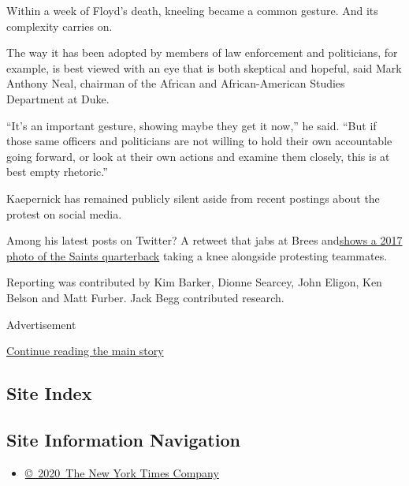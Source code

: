 Within a week of Floyd's death, kneeling became a common gesture. And
its complexity carries on.

The way it has been adopted by members of law enforcement and
politicians, for example, is best viewed with an eye that is both
skeptical and hopeful, said Mark Anthony Neal, chairman of the African
and African-American Studies Department at Duke.

``It's an important gesture, showing maybe they get it now,'' he said.
``But if those same officers and politicians are not willing to hold
their own accountable going forward, or look at their own actions and
examine them closely, this is at best empty rhetoric.''

Kaepernick has remained publicly silent aside from recent postings about
the protest on social media.

Among his latest posts on Twitter? A retweet that jabs at Brees
and\href{https://twitter.com/kylekuzma/status/1268366393457602561?s=20}{shows
a 2017 photo of the Saints quarterback} taking a knee alongside
protesting teammates.

Reporting was contributed by Kim Barker, Dionne Searcey, John Eligon,
Ken Belson and Matt Furber. Jack Begg contributed research.

Advertisement

\protect\hyperlink{after-bottom}{Continue reading the main story}

\hypertarget{site-index}{%
\subsection{Site Index}\label{site-index}}

\hypertarget{site-information-navigation}{%
\subsection{Site Information
Navigation}\label{site-information-navigation}}

\begin{itemize}
\tightlist
\item
  \href{https://help.nytimes.com/hc/en-us/articles/115014792127-Copyright-notice}{©~2020~The
  New York Times Company}
\end{itemize}

